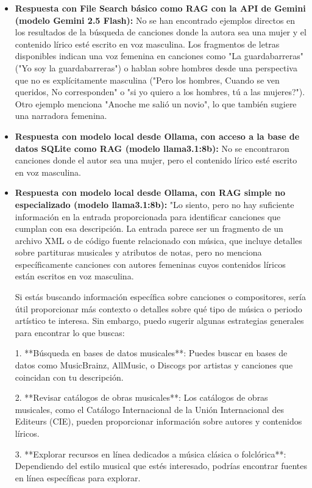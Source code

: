 \begin{itemize}
    \item \textbf{Respuesta con File Search básico como RAG con la API de Gemini (modelo Gemini 2.5 Flash):} No se han encontrado ejemplos directos en los resultados de la búsqueda de canciones donde la autora sea una mujer y el contenido lírico esté escrito en voz masculina. Los fragmentos de letras disponibles indican una voz femenina en canciones como "La guardabarreras" ("Yo soy la guardabarreras") o hablan sobre hombres desde una perspectiva que no es explícitamente masculina ("Pero los hombres, Cuando se ven queridos, No corresponden" o "si yo quiero a los hombres, tú a las mujeres?"). Otro ejemplo menciona "Anoche me salió un novio", lo que también sugiere una narradora femenina.
    \item \textbf{Respuesta con modelo local desde Ollama, con acceso a la base de datos SQLite como RAG (modelo llama3.1:8b):} No se encontraron canciones donde el autor sea una mujer, pero el contenido lírico esté escrito en voz masculina.
    \item \textbf{Respuesta con modelo local desde Ollama, con RAG simple no especializado (modelo llama3.1:8b):} "Lo siento, pero no hay suficiente información en la entrada proporcionada para identificar canciones que cumplan con esa descripción. La entrada parece ser un fragmento de un archivo XML o de código fuente relacionado con música, que incluye detalles sobre partituras musicales y atributos de notas, pero no menciona específicamente canciones con autores femeninas cuyos contenidos líricos están escritos en voz masculina.

Si estás buscando información específica sobre canciones o compositores, sería útil proporcionar más contexto o detalles sobre qué tipo de música o periodo artístico te interesa. Sin embargo, puedo sugerir algunas estrategias generales para encontrar lo que buscas:

1. **Búsqueda en bases de datos musicales**: Puedes buscar en bases de datos como MusicBrainz, AllMusic, o Discogs por artistas y canciones que coincidan con tu descripción.

2. **Revisar catálogos de obras musicales**: Los catálogos de obras musicales, como el Catálogo Internacional de la Unión Internacional des Editeurs (CIE), pueden proporcionar información sobre autores y contenidos líricos.

3. **Explorar recursos en línea dedicados a música clásica o folclórica**: Dependiendo del estilo musical que estés interesado, podrías encontrar fuentes en línea específicas para explorar.


\end{itemize}

